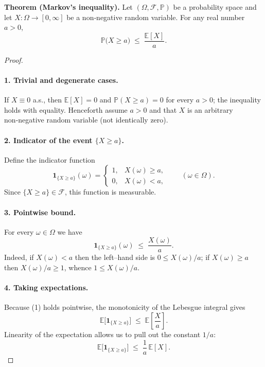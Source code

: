 \textbf{Theorem (Markov’s inequality).}  
Let \((\Omega,\mathcal{F},\mathbb{P})\) be a probability space and let  
\(X:\Omega\to[0,\infty]\) be a non‑negative random variable.  
For any real number \(a>0\),
\[
\mathbb{P}\bigl(X\ge a\bigr)\;\le\;\frac{\mathbb{E}[X]}{a}.
\]

\begin{proof}
\paragraph{1. Trivial and degenerate cases.}  
If \(X\equiv0\) a.s., then \(\mathbb{E}[X]=0\) and \(\mathbb{P}(X\ge a)=0\) for every
\(a>0\); the inequality holds with equality.  
Henceforth assume \(a>0\) and that \(X\) is an arbitrary non‑negative random
variable (not identically zero).

\paragraph{2. Indicator of the event \(\{X\ge a\}\).}  
Define the indicator function
\[
\mathbf{1}_{\{X\ge a\}}(\omega)=
\begin{cases}
1, & X(\omega)\ge a,\\[2mm]
0, & X(\omega)< a,
\end{cases}
\qquad (\omega\in\Omega).
\]
Since \(\{X\ge a\}\in\mathcal{F}\), this function is measurable.

\paragraph{3. Pointwise bound.}  
For every \(\omega\in\Omega\) we have
\begin{equation}
\mathbf{1}_{\{X\ge a\}}(\omega)\;\le\;\frac{X(\omega)}{a}. \tag{1}
\end{equation}
Indeed, if \(X(\omega)<a\) then the left–hand side is \(0\le X(\omega)/a\);
if \(X(\omega)\ge a\) then \(X(\omega)/a\ge1\), whence \(1\le X(\omega)/a\).

\paragraph{4. Taking expectations.}  
Because (1) holds pointwise, the monotonicity of the Lebesgue integral gives
\[
\mathbb{E}\bigl[\mathbf{1}_{\{X\ge a\}}\bigr]\;\le\;\mathbb{E}\!\left[\frac{X}{a}\right].
\]
Linearity of the expectation allows us to pull out the constant \(1/a\):
\begin{equation}
\mathbb{E}\bigl[\mathbf{1}_{\{X\ge a\}}\bigr]\;\le\;\frac{1}{a}\,\mathbb{E}[X]. \tag{2}
\end{equation}


\end{proof}
